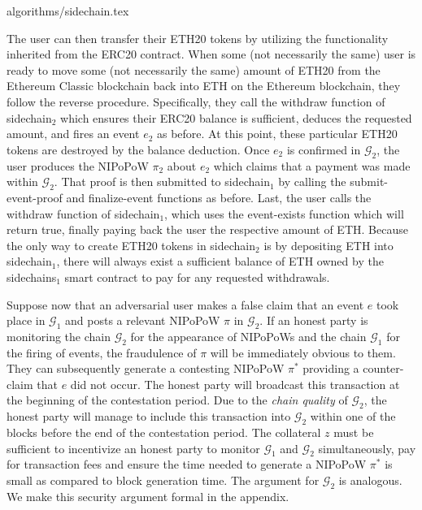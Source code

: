 {algorithms/sidechain.tex}

The user can then transfer their ETH20 tokens by utilizing the functionality
inherited from the \textsf{ERC20} contract.  When some (not necessarily the
same) user is ready to move some (not necessarily the same) amount of ETH20 from
the Ethereum Classic blockchain back into ETH on the Ethereum blockchain, they
follow the reverse procedure. Specifically, they call the \textsf{withdraw}
function of \textsf{sidechain}$_2$ which ensures their ERC20 balance is
sufficient, deduces the requested amount, and fires an event $e_2$ as before. At
this point, these particular ETH20 tokens are destroyed by the balance
deduction. Once $e_2$ is confirmed in $\mathcal{G}_2$, the user produces the
NIPoPoW $\pi_2$ about $e_2$ which claims that a payment was made within
$\mathcal{G}_2$. That proof is then submitted to \textsf{sidechain}$_1$ by
calling the \textsf{submit-event-proof} and \textsf{finalize-event} functions as
before. Last, the user calls the \textsf{withdraw} function of
\textsf{sidechain}$_1$, which uses the \textsf{event-exists} function which will
return \textsf{true}, finally paying back the user the respective amount of ETH.
Because the only way to create ETH20 tokens in \textsf{sidechain}$_2$ is by
depositing ETH into \textsf{sidechain}$_1$, there will always exist a sufficient
balance of ETH owned by the \textsf{sidechains}$_1$ smart contract to pay for
any requested withdrawals.

Suppose now that an adversarial user makes a false claim that an event $e$ took
place in $\mathcal{G}_1$ and posts a relevant NIPoPoW $\pi$ in $\mathcal{G}_2$.
If an honest party is monitoring the chain $\mathcal{G}_2$ for the appearance of
NIPoPoWs and the chain $\mathcal{G}_1$ for the firing of events, the fraudulence
of $\pi$ will be immediately obvious to them. They can subsequently generate a
contesting NIPoPoW $\pi^*$ providing a counter-claim that $e$ did not occur. The
honest party will broadcast this transaction at the beginning of the
contestation period. Due to the \emph{chain quality} of $\mathcal{G}_2$, the
honest party will manage to include this transaction into $\mathcal{G}_2$ within
one of the blocks before the end of the contestation period. The collateral $z$
must be sufficient to incentivize an honest party to monitor $\mathcal{G}_1$ and
$\mathcal{G}_2$ simultaneously, pay for transaction fees and ensure the time
needed to generate a NIPoPoW $\pi^*$ is small as compared to block generation
time. The argument for $\mathcal{G}_2$ is analogous. We make this security
argument formal in the appendix.
